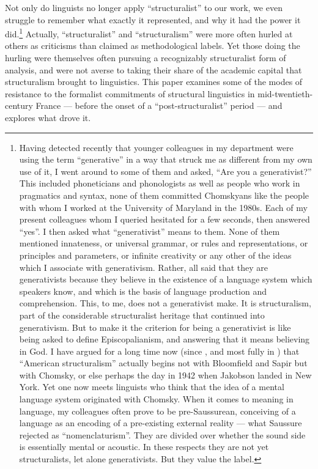 \documentclass[output=paper]{langscibook}
\begin{document}
Not only do linguists no longer apply ``structuralist'' to our work, we even struggle to remember what exactly it represented, and why it had the power it did.\footnote{Having detected recently that younger colleagues in my department were using the term ``generative'' in a way that struck me as different from my own use of it, I went around to some of them and asked, ``Are you a generativist?'' This included phoneticians and phonologists as well as people who work in pragmatics and syntax, none of them committed Chomskyans like the people with whom I worked at the University of Maryland in the 1980s. Each of my present colleagues whom I queried hesitated for a few seconds, then answered ``yes''. I then asked what ``generativist'' means to them. None of them mentioned innateness, or universal grammar, or rules and representations, or principles and parameters, or infinite creativity or any other of the ideas which I associate with generativism. Rather, all said that they are generativists because they believe in the existence of a language system which speakers know, and which is the basis of language production and comprehension. This, to me, does not a generativist make. It is structuralism, part of the considerable structuralist heritage that continued into generativism. But to make it the criterion for being a generativist is like being asked to define Episcopalianism, and answering that it means believing in God. I have argued for a long time now (since \citealt{Joseph1999}, and most fully in \citealt{Joseph2002}) that ``American structuralism'' actually begins not with Bloomfield and Sapir but with Chomsky, or else perhaps the day in 1942 when Jakobson landed in New York. Yet one now meets linguists who think that the idea of a mental language system originated with Chomsky. When it comes to meaning in language, my colleagues often prove to be pre-Saussurean, conceiving of a language as an encoding of a pre-existing external reality — what Saussure rejected as ``nomenclaturism''. They are divided over whether the sound side is essentially mental or acoustic. In these respects they are not yet structuralists, let alone generativists. But they value the label.} Actually, ``structuralist'' and ``structuralism'' were more often hurled at others as criticisms than claimed as methodological labels. Yet those doing the hurling were themselves often pursuing a recognizably structuralist form of analysis, and were not averse to taking their share of the academic capital that structuralism brought to linguistics. This paper examines some of the modes of resistance to the formalist commitments of structural linguistics in mid-twentieth-century France — before the onset of a ``post-structuralist'' period — and explores what drove it.
\end{document}
